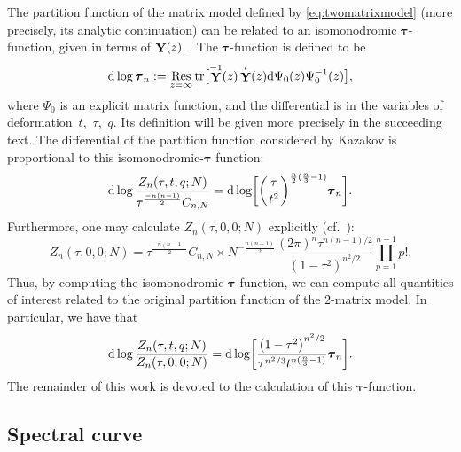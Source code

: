 \documentclass[10pt,a4paper]{amsart}
\DeclareMathOperator{\tr}{tr}
\DeclareMathOperator*{\Ress}{Res}
\newcommand{\Res}{\displaystyle\Ress}
\DeclareMathOperator{\YY}{{\bf Y}}
\numberwithin{equation}{section}
\begin{document}
The partition function of the matrix model defined by \eqref{eq:twomatrixmodel} (more precisely, its analytic continuation) can be related to an isomonodromic $\boldsymbol{\tau}$-function, given in terms of $\YY(z)$~\cite{Bertola-Marchal}. The $\boldsymbol{\tau}$-function is defined to be
 \begin{equation*} %
 {\rm d}\log \boldsymbol{\tau}_n := \Res_{z=\infty}\tr\bigl[ \YY^{-1}(z) \YY'(z) {\rm d}\Psi_0(z) \Psi_0^{-1}(z)\bigr],
 \end{equation*}
where $\Psi_0$ is an explicit matrix function, and the differential is in the variables of deformation~$t$,~$\tau$,~$q$. Its definition will be given more precisely in the succeeding text. The differential of the partition function
considered by Kazakov is proportional to this isomonodromic-$\boldsymbol{\tau}$ function:
 \begin{equation*} %
 {\rm d}\log \frac{Z_{n}(\tau,t,q;N)}{\tau^{\frac{-n(n-1)}{2}}C_{n,N}} = {\rm d}\log \biggl[\biggl(\frac{\tau}{t^2}\biggr)^{\frac{n}{2}(\frac{n}{3}-1)}\boldsymbol{\tau}_n\biggr].
 \end{equation*}
Furthermore, one may calculate $Z_{n}(\tau,0,0;N)$ explicitly (cf.~\cite[Appendix A.49]{Mehta-Book}):
 \begin{equation*} %
 Z_{n}(\tau,0,0;N) = \tau^{\frac{-n(n-1)}{2}}C_{n,N} \times N^{-\frac{n(n+1)}{2}}\frac{(2\pi)^{n}\tau^{n(n-1)/2}}{(1-\tau^2)^{n^2/2}}\prod_{p=1}^{n-1}p!.
 \end{equation*}
Thus, by computing the isomonodromic $\boldsymbol{\tau}$-function, we can compute all quantities of interest related to the original partition function of the $2$-matrix model. In particular, we have that
 \begin{equation*}
 {\rm d}\log \frac{Z_{n}(\tau,t,q;N)}{Z_{n}(\tau,0,0;N)} = {\rm d}\log \biggl[\frac{\bigl(1-\tau^2\bigr)^{n^2/2}}{\tau^{n^2/3}t^{n(\frac{n}{3}-1)}}\boldsymbol{\tau}_n\biggr].
 \end{equation*}
The remainder of this work is devoted to the calculation of this $\boldsymbol{\tau}$-function.


\subsection{Spectral curve}
\end{document}
